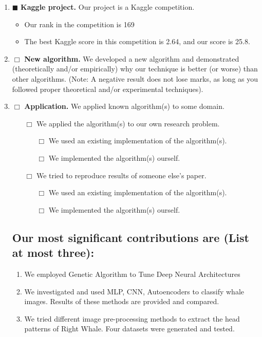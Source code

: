 \documentclass[11pt]{article}
\begin{document}
\begin{enumerate}

\item $\blacksquare$ \textbf{Kaggle project.} Our project is a Kaggle competition.
\begin{itemize} \item Our rank in the competition is 169 
\item  The best Kaggle score in this competition is 2.64, and our score is 25.8.
\end{itemize}




 \item $\Box$ \textbf{New algorithm.}  We developed a new algorithm and
 demonstrated (theoretically and/or empirically) why our technique
is better (or worse) than other algorithms. (Note: A negative result
does not lose marks, as long as  you followed proper theoretical
and/or experimental techniques). \item $\Box$ \textbf{Application.}
We applied known algorithm(s) to some domain.
\begin{itemize}
\item [$\Box$] We applied the algorithm(s) to our own research
problem.
\begin{itemize}
\item [$\Box$] We used an existing implementation of the
algorithm(s).  \item [$\Box$] We implemented the algorithm(s)
ourself.
\end{itemize}
 \item [$\Box$] We tried to reproduce results of someone
else's paper.
\begin{itemize}
\item [$\Box$] We used an existing implementation of the
algorithm(s).  \item [$\Box$] We implemented the algorithm(s)
ourself.
\end{itemize}
\end{itemize} 
\subsection*{Our most significant contributions are (List at most three):}
\begin{enumerate}
	\item{We employed Genetic Algorithm to Tune Deep Neural Architectures}
	\item{We investigated and used MLP, CNN, Autoencoders to classify whale images. Results of these methods are provided and compared.}
	\item{We tried different image pre-processing methods to extract the head patterns of Right Whale. Four datasets were generated and tested.}
\end{enumerate}

\end{enumerate}
\end{document}
